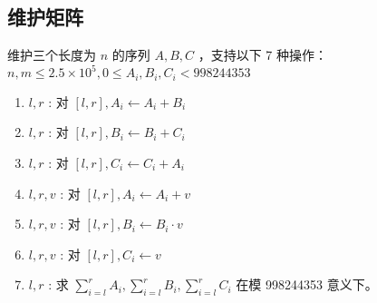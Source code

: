 \subsection{维护矩阵}
\begin{tcolorbox}
\par \noindent 维护三个长度为 $n$ 的序列 $A, B, C$ ，支持以下 7 种操作：$n, m \leq 2.5 \times 10^5, 0 \leq A_{i}, B_{i}, C_{i}<998244353$
\begin{enumerate}
\item $l, r$ : 对 $[l, r], A_{i} \leftarrow A_{i}+B_{i}$
\item $l, r$ : 对 $[l, r],  B_{i} \leftarrow B_{i}+C_{i}$
\item $l, r$ : 对 $[l, r], C_{i} \leftarrow C_{i}+A_{i}$ 
\item $l, r,v$ : 对 $[l, r],  A_{i} \leftarrow A_{i}+v$
\item $l, r,v$ : 对 $[l, r],   B_{i} \leftarrow B_{i} \cdot v$ 
\item $l, r,v$ : 对 $[l, r],   C_{i} \leftarrow v$
\item $l,r$ : 求 $\sum_{i=l}^{r} A_{i}, \sum_{i=l}^{r} B_{i}, \sum_{i=l}^{r} C_{i}$ 在模 998244353 意义下。 
\end{enumerate}
\end{tcolorbox}
